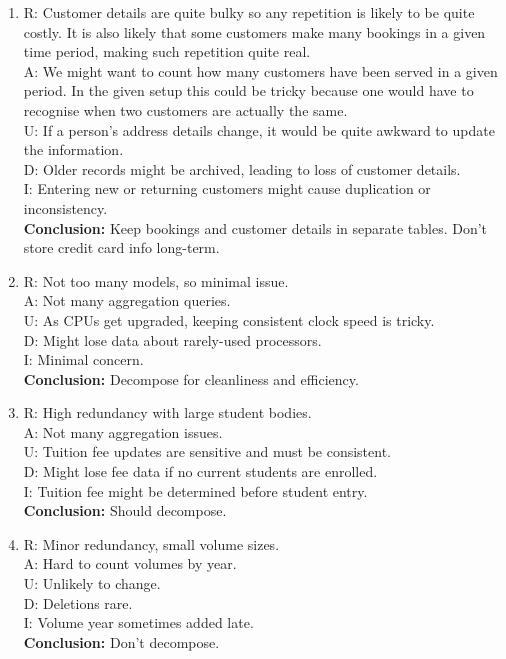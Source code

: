 \begin{enumerate}[label=\alph*.]
  \item R: Customer details are quite bulky so any repetition is likely to be quite costly. It is also likely that some
  customers make many bookings in a given time period, making such repetition quite real.\\
  A: We might want to count how many customers have been served in a given period. In the given setup
  this could be tricky because one would have to recognise when two customers are actually the same.\\
  U: If a person’s address details change, it would be quite awkward to update the information.\\
  D: Older records might be archived, leading to loss of customer details.\\
  I: Entering new or returning customers might cause duplication or inconsistency.\\
  \textbf{Conclusion:} Keep bookings and customer details in separate tables. Don’t store credit card info long-term.

  \item R: Not too many models, so minimal issue.\\
  A: Not many aggregation queries.\\
  U: As CPUs get upgraded, keeping consistent clock speed is tricky.\\
  D: Might lose data about rarely-used processors.\\
  I: Minimal concern.\\
  \textbf{Conclusion:} Decompose for cleanliness and efficiency.

  \item R: High redundancy with large student bodies.\\
  A: Not many aggregation issues.\\
  U: Tuition fee updates are sensitive and must be consistent.\\
  D: Might lose fee data if no current students are enrolled.\\
  I: Tuition fee might be determined before student entry.\\
  \textbf{Conclusion:} Should decompose.

  \item R: Minor redundancy, small volume sizes.\\
  A: Hard to count volumes by year.\\
  U: Unlikely to change.\\
  D: Deletions rare.\\
  I: Volume year sometimes added late.\\
  \textbf{Conclusion:} Don’t decompose.
\end{enumerate}

